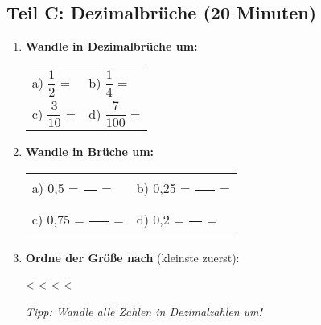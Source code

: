 \subsection*{Teil C: Dezimalbrüche (20 Minuten)}

\begin{enumerate}[resume, label=\arabic*.]
    \item \textbf{Wandle in Dezimalbrüche um:}

    \vspace{0.3cm}
    \begin{tabular}{ll}
        a) $\dfrac{1}{2}$ = \underline{\hspace{3cm}} & b) $\dfrac{1}{4}$ = \underline{\hspace{3cm}} \\[2ex]
        c) $\dfrac{3}{10}$ = \underline{\hspace{3cm}} & d) $\dfrac{7}{100}$ = \underline{\hspace{3cm}}
    \end{tabular}

    \vspace{0.8cm}

    \item \textbf{Wandle in Brüche um:}

    \vspace{0.3cm}
    \begin{tabular}{ll}
        a) 0,5 = $\dfrac{\phantom{10}}{\phantom{10}}$ = \underline{\hspace{3cm}} & 
        b) 0,25 = $\dfrac{\phantom{100}}{\phantom{100}}$ = \underline{\hspace{3cm}} \\[3ex]
        c) 0,75 = $\dfrac{\phantom{100}}{\phantom{100}}$ = \underline{\hspace{3cm}} & 
        d) 0,2 = $\dfrac{\phantom{10}}{\phantom{10}}$ = \underline{\hspace{3cm}}
    \end{tabular}

    \vspace{0.8cm}

    \item \textbf{Ordne der Größe nach} (kleinste zuerst):

    \begin{center}
         \quad {} \quad {} \quad {} \quad {}
    \end{center}

    \vspace{0.5cm}
    \underline{\hspace{2cm}} < \underline{\hspace{2cm}} < \underline{\hspace{2cm}} < \underline{\hspace{2cm}} < \underline{\hspace{2cm}}

    \vspace{0.3cm}
    \textit{Tipp: Wandle alle Zahlen in Dezimalzahlen um!}
\end{enumerate}
